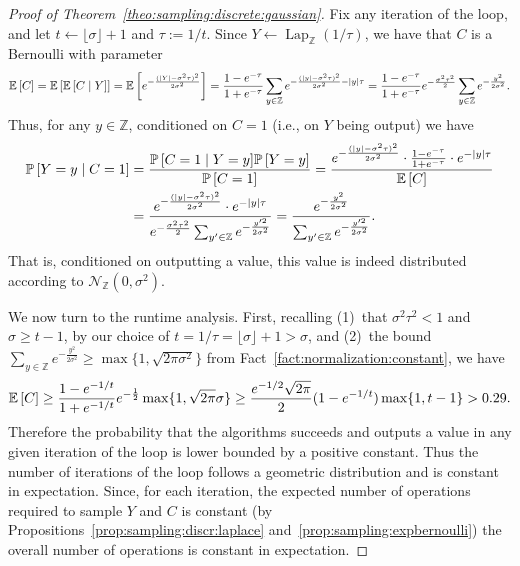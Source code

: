 \documentclass{jpc}
\newcommand{\discL}{\operatorname{Lap}_{\Z}} \newcommand{\discN}{\mathcal{N}_{\Z}}
\newcommand{\dgausss}[2]{{\discN\left(#1,#2\right)}}
\newcommand{\dgauss}[1]{\dgausss{0}{#1}}
\newcommand{\ex}[2]{{\ifx&#1& \mathbb{E} \else
\underset{#1}{\mathbb{E}} \fi \left[#2\right]}}
\newcommand{\pr}[2]{{\ifx&#1& \mathbb{P} \else
\underset{#1}{\mathbb{P}} \fi \left[#2\right]}}
\newcommand{\eqdef}{:=}
\newcommand{\Z}{\mathbb{Z}}
\begin{document}
\begin{proof}[Proof of Theorem~\ref{theo:sampling:discrete:gaussian}]
    Fix any iteration of the loop, and let $t \gets \lfloor \sigma \rfloor+1$ and $\tau\eqdef 1/t$. Since $Y\gets \discL(1/\tau)$, we have that $C$ is a Bernoulli with parameter
    \[
          \ex{}{C} = \ex{}{ \ex{}{C \mid Y} } = \ex{}{ e^{-\frac{(|Y|-\sigma^2\tau)^2}{2\sigma^2}} } = \frac{1-e^{-\tau}}{1+e^{-\tau}} \sum_{y\in\Z} e^{-\frac{(|y|-\sigma^2\tau)^2}{2\sigma^2} - |y|\tau}
          = \frac{1-e^{-\tau}}{1+e^{-\tau}}e^{-\frac{\sigma^2\tau^2}{2}}\sum_{y\in\Z} e^{-\frac{y^2}{2\sigma^2}}.
    \]
    Thus, for any $y\in \Z$, conditioned on $C=1$ (i.e., on $Y$ being output) we have
    \begin{align*}
        \pr{}{ Y=y \mid C=1 } 
        &= \frac{ \pr{}{ C=1 \mid Y=y } \pr{}{Y=y} }{ \pr{}{C=1} }
        = \frac{ e^{-\frac{(|y|-\sigma^2\tau)^2}{2\sigma^2}} \cdot \frac{1-e^{-\tau}}{1+e^{-\tau}}\cdot e^{-|y|\tau} }{ \ex{}{C} }\\
        &= \frac{ e^{-\frac{(|y|-\sigma^2\tau)^2}{2\sigma^2}} \cdot e^{-|y|\tau} }{ e^{-\frac{\sigma^2\tau^2}{2}}\sum_{y'\in\Z} e^{-\frac{y'^2}{2\sigma^2}} }
        = \frac{ e^{-\frac{y^2}{2\sigma^2}} }{\sum_{y'\in\Z} e^{-\frac{y'^2}{2\sigma^2}} }.
    \end{align*}
    That is, conditioned on outputting a value, this value is indeed distributed according to $\dgauss{\sigma^2}$.
    
    We now turn to the runtime analysis. First, recalling (1)~that $\sigma^2\tau^2 < 1$ and $\sigma\ge t-1$, by our choice of $t = 1/\tau = \lfloor \sigma \rfloor + 1 > \sigma$, and (2)~the bound $\sum_{y\in\Z} e^{-\frac{y^2}{2\sigma^2}} \ge \max\{1,\sqrt{2\pi\sigma^2}\}$ from Fact~\ref{fact:normalization:constant}, we have
    $$
    \ex{}{C} \ge \frac{1-e^{-1/t}}{1+e^{-1/t}}e^{-\frac{1}{2}} \max\{1,\sqrt{2\pi}\sigma\} \ge \frac{e^{-1/2} \sqrt{2\pi}}{2} (1-e^{-1/t})\max\{1,t-1\} > 0.29.
    $$
    Therefore the probability that the algorithms succeeds and outputs a value in any given iteration of the loop is lower bounded by a positive constant. Thus the number of iterations of the loop follows a geometric distribution and is constant in expectation. Since, for each iteration, the expected number of operations required to sample $Y$ and $C$ is constant (by Propositions~\ref{prop:sampling:discr:laplace} and~\ref{prop:sampling:expbernoulli}) the overall number of operations is constant in expectation.
\end{proof}
\end{document}
